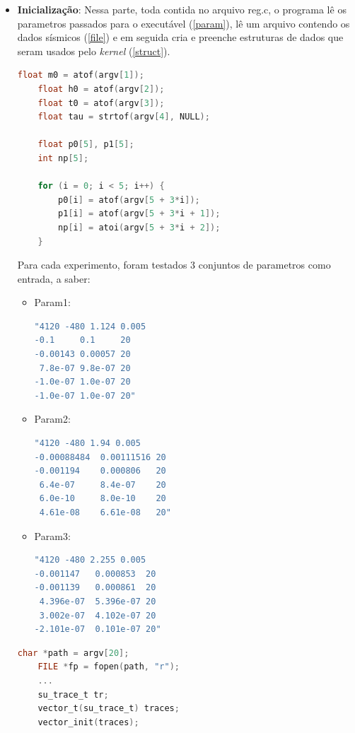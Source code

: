 \documentclass[12pt]{article}
\begin{document}
\begin{itemize}
\item \textbf{Inicialização}: Nessa parte, toda contida no arquivo reg.c, o programa lê os parametros passados para o executável (\ref{param}), lê um arquivo contendo os dados sísmicos (\ref{file}) e em seguida cria e preenche estruturas de dados que seram usados pelo \textit{kernel} (\ref{struct}). 

\begin{lstlisting}[language=c, caption=Leitura dos parametros passados para o executável., label=param]
    float m0 = atof(argv[1]);
    float h0 = atof(argv[2]);
    float t0 = atof(argv[3]);
    float tau = strtof(argv[4], NULL);
    
    float p0[5], p1[5];
    int np[5];
 
    for (i = 0; i < 5; i++) {
        p0[i] = atof(argv[5 + 3*i]);
        p1[i] = atof(argv[5 + 3*i + 1]);
        np[i] = atoi(argv[5 + 3*i + 2]);
    }
\end{lstlisting}

Para cada experimento, foram testados 3 conjuntos de parametros como entrada, a saber:

\begin{itemize}
\item Param1: 
\begin{lstlisting}[language=bash]
"4120 -480 1.124 0.005
-0.1     0.1     20 
-0.00143 0.00057 20 
 7.8e-07 9.8e-07 20 
-1.0e-07 1.0e-07 20 
-1.0e-07 1.0e-07 20"
\end{lstlisting}
\item Param2:
\begin{lstlisting}[language=bash]
"4120 -480 1.94 0.005
-0.00088484  0.00111516 20 
-0.001194    0.000806   20 
 6.4e-07     8.4e-07    20 
 6.0e-10     8.0e-10    20 
 4.61e-08    6.61e-08   20"
\end{lstlisting}
\item Param3:
\begin{lstlisting}[language=bash]
"4120 -480 2.255 0.005
-0.001147   0.000853  20 
-0.001139   0.000861  20 
 4.396e-07  5.396e-07 20 
 3.002e-07  4.102e-07 20 
-2.101e-07  0.101e-07 20"
\end{lstlisting}
\end{itemize}

\begin{lstlisting}[language=c, caption=Leitura do arquivo com os dados sismícos., label=file]
    char *path = argv[20];
    FILE *fp = fopen(path, "r");
	...
    su_trace_t tr;
    vector_t(su_trace_t) traces;
    vector_init(traces);


\end{lstlisting}
\end{itemize}
\end{document}

